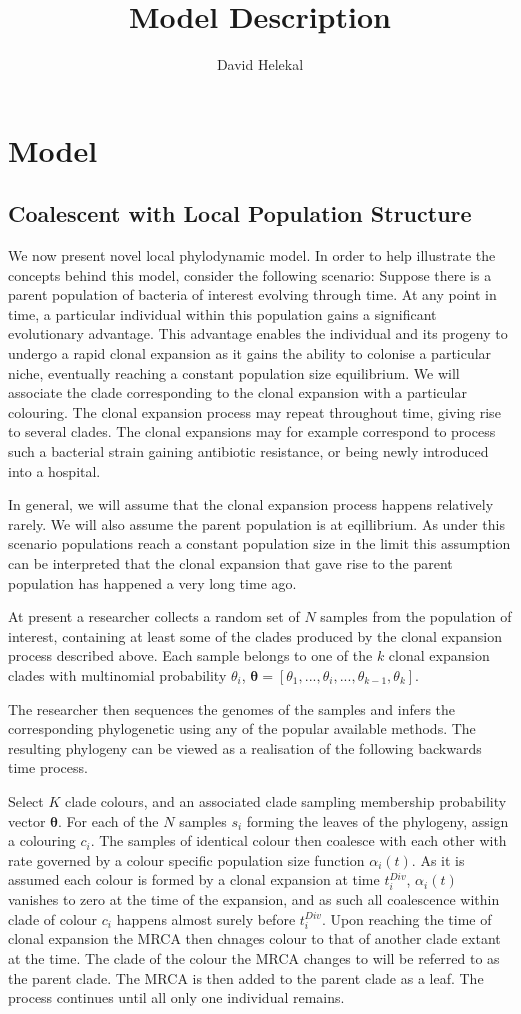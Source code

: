 \documentclass{report}
\title{Model Description}
\author{David Helekal}
\theoremstyle{definition}
\begin{document}
\chapter{Model}
\section{Coalescent with Local Population Structure}
We now present novel local phylodynamic model.
In order to help illustrate the concepts behind this model, consider the following scenario:
Suppose there is a parent population of bacteria of interest evolving through time. At any point in time, a particular individual within this population gains a significant evolutionary advantage. This advantage enables the individual and its progeny to undergo a rapid clonal expansion as it gains the ability to colonise a particular niche, eventually reaching a constant population size equilibrium. We will associate the clade corresponding to the clonal expansion with a particular colouring. 
The clonal expansion process may repeat throughout time, giving rise to several clades. The clonal expansions may for example correspond to process such a bacterial strain gaining antibiotic resistance, or being newly introduced into a hospital.

In general, we will assume that the clonal expansion process happens relatively rarely. We will also assume the parent population is at eqillibrium. As under this scenario populations reach a constant population size in the limit this assumption can be interpreted that the clonal expansion that gave rise to the parent population has happened a very long time ago.

At present a researcher collects a random set of $N$ samples from the population of interest, containing at least some of the clades produced by the clonal expansion process described above. Each sample belongs to one of the $k$ clonal expansion clades with multinomial probability $\theta_i$, $\pmb{\theta} = [\theta_1, ..., \theta_i, ..., \theta_{k-1}, \theta_{k}]$.

The researcher then sequences the genomes of the samples and infers the corresponding phylogenetic using any of the popular available methods.
The resulting phylogeny can be viewed as a realisation of the following backwards time process. 

Select $K$ clade colours, and an associated clade sampling membership probability vector $\pmb{\theta}$. For each of the $N$ samples $s_i$ forming the leaves of the phylogeny, assign a colouring $c_i$. The samples of identical colour then coalesce with each other with rate governed by a colour specific population size function $\alpha_i(t)$. As it is assumed each colour is formed by a clonal expansion at time $t^{Div}_{i}$, $\alpha_i(t)$ vanishes to zero at the time of the expansion, and as such all coalescence within clade of colour $c_i$ happens almost surely before $t^{Div}_{i}$. Upon reaching the time of clonal expansion the MRCA then chnages colour to that of another clade extant at the time. The clade of the colour the MRCA changes to will be referred to as the parent clade. The MRCA is then added to the parent clade as a leaf. 
The process continues until all only one individual remains.
\end{document}
